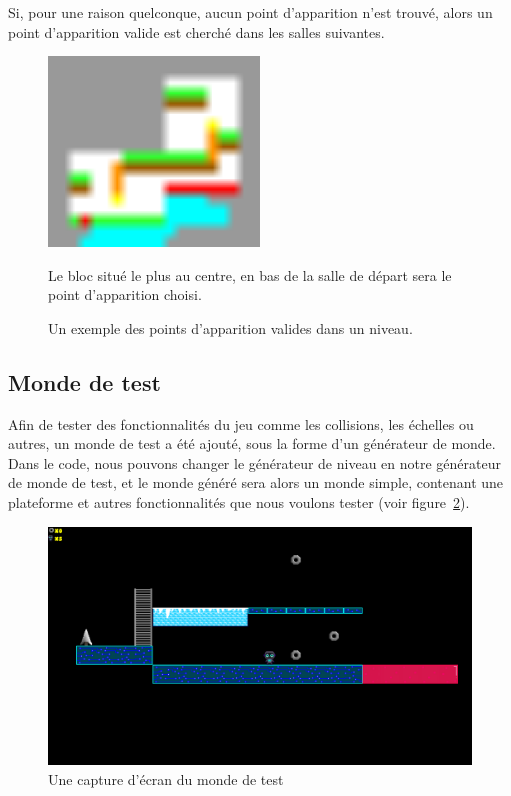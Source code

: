 \documentclass[10pt]{report}
\begin{document}
Si, pour une raison quelconque, aucun point d'apparition n'est trouvé, alors un point d'apparition valide est
cherché dans les salles suivantes.

\begin{figure}[H]
  \centering
  \includegraphics[width=0.5\textwidth]{images/valid_spawn_locations}
  \caption{Un exemple des points d'apparition valides dans un niveau.}
  Le bloc situé le plus au centre, en bas de la salle de départ sera le point d'apparition choisi.
  \label{fig:spawn_points}
\end{figure}

\subsection{Monde de test}

Afin de tester des fonctionnalités du jeu comme les collisions, les 
échelles ou autres, un monde de test a été ajouté, sous la forme d'un 
générateur de monde.
Dans le code, nous pouvons changer le générateur de
niveau en notre générateur de monde de test, et le monde généré sera alors
un monde simple, contenant une plateforme et autres fonctionnalités que
nous voulons tester (voir figure~\ref{fig:test_world}).

\begin{figure}[H]
  \centering
  \includegraphics[width=\textwidth]{images/test_world}
  \caption{Une capture d'écran du monde de test}
  \label{fig:test_world}
\end{figure}
\end{document}
